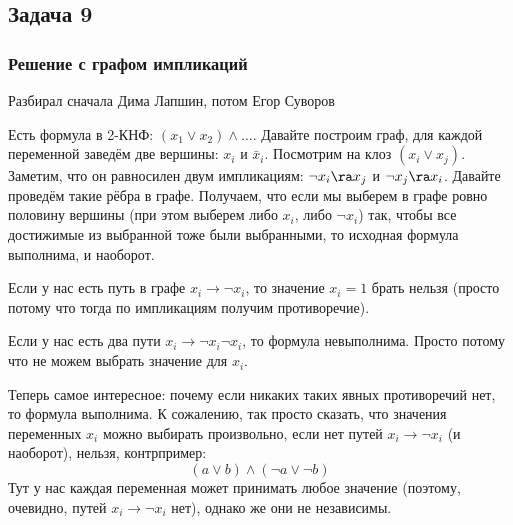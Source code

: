 \subsection{Задача 9}
\subsubsection{Решение с графом импликаций}
	Разбирал сначала Дима Лапшин, потом Егор Суворов

	Есть формула в 2-КНФ: $(x_1 \lor x_2) \land \dots$.
	Давайте построим граф, для каждой переменной заведём две вершины: $x_i$ и $\bar x_i$.
	Посмотрим на клоз $(x_i \lor x_j)$.
	Заметим, что он равносилен двум импликациям: $\lnot x_i \ra x_j$ и $\lnot x_j \ra x_i$.
	Давайте проведём такие рёбра в графе.
	Получаем, что если мы выберем в графе ровно половину вершины (при этом выберем либо $x_i$,
	либо $\lnot x_i$) так, чтобы все достижимые из выбранной тоже были выбранными, то исходная формула выполнима,
	и наоборот.
	
	\begin{assertion}
		Если у нас есть путь в графе $x_i \to \lnot x_i$, то значение
		$x_i=1$ брать нельзя (просто потому что тогда по импликациям получим противоречие).
	\end{assertion}
	\begin{assertion}
		Если у нас есть два пути $x_i \to \lnot x_i \lnot x_i$, то формула невыполнима.
		Просто потому что не можем выбрать значение для $x_i$.
	\end{assertion}

	Теперь самое интересное: почему если никаких таких явных противоречий нет, то формула выполнима.
	К сожалению, так просто сказать, что значения переменных $x_i$ можно выбирать произвольно, если
	нет путей $x_i \to \lnot x_i$ (и наоборот), нельзя, контрпример:
	\[ (a \lor b) \land (\lnot a \lor \lnot b) \]
	Тут у нас каждая переменная может принимать любое значение (поэтому, очевидно, путей $x_i \to \lnot x_i$
	нет), однако же они не независимы.

